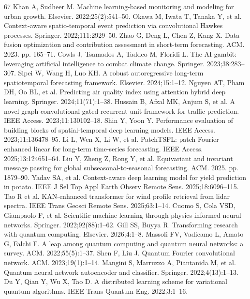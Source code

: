 \documentclass[pdflatex,sn-mathphys,Numbered]{sn-jnl}%
\begin{document}
\begin{thebibliography}{67}
 Khan A, Sudheer M. Machine learning-based monitoring and modeling for urban growth. Elsevier. 2022;25(2):541--50.
 Okawa M, Iwata T, Tanaka Y, et al. Context-aware spatio-temporal event prediction via convolutional Hawkes processes. Springer. 2022;111:2929--50.
 Zhao G, Deng L, Chen Z, Kang X. Data fusion optimization and contribution assessment in short-term forecasting. ACM. 2023. pp. 165--71.
 Cowls J, Tsamados A, Taddeo M, Floridi L. The AI gambit: leveraging artificial intelligence to combat climate change. Springer. 2023;38:283--307.
 Sipei W, Wang H, Luo KH. A robust autoregressive long-term spatiotemporal forecasting framework. Elsevier. 2024;15:1--12.
 Nguyen AT, Pham DH, Oo BL, et al. Predicting air quality index using attention hybrid deep learning. Springer. 2024;11(71):1--38.
 Hussain B, Afzal MK, Anjum S, et al. A novel graph convolutional gated recurrent unit framework for traffic prediction. IEEE Access. 2023;11:130102--18.
 Shin Y, Yoon Y. Performance evaluation of building blocks of spatial-temporal deep learning models. IEEE Access. 2023;11:136478--95.
 Li L, Wen X, Li W, et al. PatchTSFL: patch Fourier enhanced linear for long-term time-series forecasting. IEEE Access. 2025;13:124651--64.
 Liu Y, Zheng Z, Rong Y, et al. Equivariant and invariant message passing for global subseasonal-to-seasonal forecasting. ACM. 2025. pp. 1879--90.
 Yadav SA, et al. Context-aware deep learning model for yield prediction in potato. IEEE J Sel Top Appl Earth Observ Remote Sens. 2025;18:6096--115.
 Tao R et al. KAN-enhanced transformer for wind profile retrieval from lidar spectra. IEEE Trans Geosci Remote Sens. 2025;63:1--14.
 Cuomo S, Cola VSD, Giampaolo F, et al. Scientific machine learning through physics-informed neural networks. Springer. 2022;92(88):1--62.
 Gill SS, Buyya R. Transforming research with quantum computing. Elsevier. 2026;4:1--8.
 Massoli FV, Vadicamo L, Amato G, Falchi F. A leap among quantum computing and quantum neural networks: a survey. ACM. 2022;55(5):1--37.
 Shen F, Liu J. Quantum Fourier convolutional network. ACM. 2023;19(1):1--14.
 Mangini S, Marruzzo A, Piantanida M, et al. Quantum neural network autoencoder and classifier. Springer. 2022;4(13):1--13.
 Du Y, Qian Y, Wu X, Tao D. A distributed learning scheme for variational quantum algorithms. IEEE Trans Quantum Eng. 2022;3:1--16.

\end{thebibliography}
\end{document}
